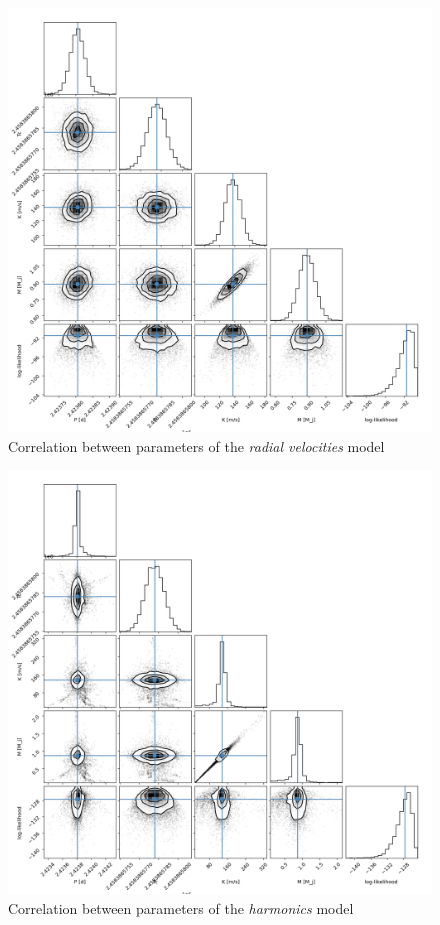 \documentclass[a4paper,11pt,twocolumn]{article}
\begin{document}
\begin{figure}[h]
    \centering
      \includegraphics[scale=0.25, angle=0]{../pictures/RV/corner_RV.png}
      \caption{Correlation between parameters of the \textit{radial velocities} model}
     \label{fig: cpRV}
\end{figure}

\begin{figure}[h]
    \centering
      \includegraphics[scale=0.25, angle=0]{../pictures/RV/corner_RV_harmonics.png}
      \caption{Correlation between parameters of the \textit{harmonics} model}
     \label{fig: cpRV2}
\end{figure}
\end{document}
